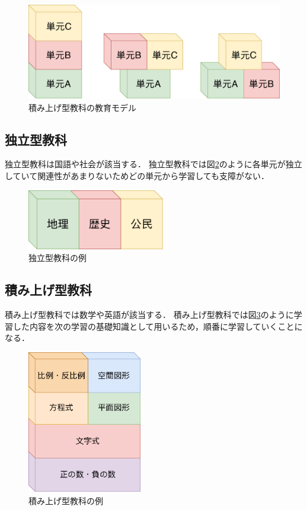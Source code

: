 \documentclass[a4j,12pt]{jsarticle}
\begin{document}
\begin{figure}[H]
\centering
\includegraphics[width=12cm]{03.pdf}
\caption{積み上げ型教科の教育モデル}
\label{fig:03}
\end{figure} 


\subsection{独立型教科}
独立型教科は国語や社会が該当する．
独立型教科では図\ref{fig:01}のように各単元が独立していて関連性があまりないためどの単元から学習しても支障がない．\\
\begin{figure}[H]
\centering
\includegraphics[width=6cm]{01.pdf}
\caption{独立型教科の例}
\label{fig:01}
\end{figure} 

\subsection{積み上げ型教科}
積み上げ型教科では数学や英語が該当する．
積み上げ型教科では図\ref{fig:04}のように学習した内容を次の学習の基礎知識として用いるため，順番に学習していくことになる．\\

\begin{figure}[H]
\centering
\includegraphics[width=5cm]{04.pdf}
\caption{積み上げ型教科の例}
\label{fig:04}
\end{figure} 
\end{document}
